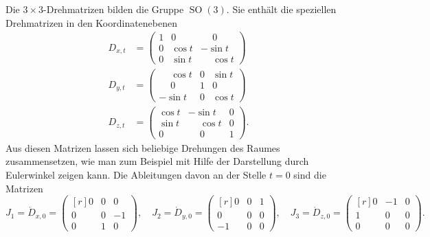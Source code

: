 \begin{beispiel}
Die $3\times 3$-Drehmatrizen bilden die Gruppe $\operatorname{SO}(3)$.
Sie enthält die speziellen Drehmatrizen in den Koordinatenebenen
\begin{align*}
D_{x,t}
&=
\begin{pmatrix}
1 & 0      & \phantom{-}0      \\
0 & \cos t &          - \sin t \\
0 & \sin t & \phantom{-}\cos t
\end{pmatrix}
\\
D_{y,t}
&=
\begin{pmatrix}
\phantom{-}\cos t & 0 & \sin t \\
\phantom{-}0      & 1 & 0      \\
         - \sin t & 0 & \cos t
\end{pmatrix}
\\
D_{z,t}
&=
\begin{pmatrix}
\cos t &          - \sin t & 0\\
\sin t & \phantom{-}\cos t & 0\\
0      & \phantom{-}0      & 1
\end{pmatrix}.
\end{align*}
Aus diesen Matrizen lassen sich beliebige Drehungen des Raumes
zusammensetzen, wie man zum Beispiel mit Hilfe der Darstellung durch
Eulerwinkel zeigen kann.
Die Ableitungen davon an der Stelle $t=0$ sind die Matrizen
\[
J_1
=
\dot{D}_{x,0}
=
\begin{pmatrix*}[r]
0&0& 0\\
0&0&-1\\
0&1& 0
\end{pmatrix*}
,\quad
J_2
=
\dot{D}_{y,0}
=
\begin{pmatrix*}[r]
 0&0&1\\
 0&0&0\\
-1&0&0
\end{pmatrix*}
,\quad
J_3
=
\dot{D}_{z,0}
=
\begin{pmatrix*}[r]
0&-1&0\\
1& 0&0\\
0& 0&0
\end{pmatrix*}.
\]
\end{beispiel}

